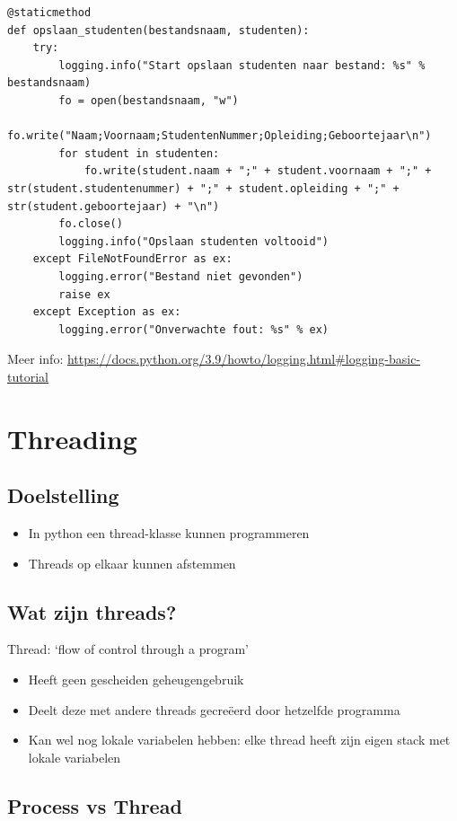 \documentclass{article}
\begin{document}
\begin{verbatim}
@staticmethod
def opslaan_studenten(bestandsnaam, studenten):
    try:
        logging.info("Start opslaan studenten naar bestand: %s" % bestandsnaam)
        fo = open(bestandsnaam, "w")
        fo.write("Naam;Voornaam;StudentenNummer;Opleiding;Geboortejaar\n")
        for student in studenten:
            fo.write(student.naam + ";" + student.voornaam + ";" + str(student.studentenummer) + ";" + student.opleiding + ";" + str(student.geboortejaar) + "\n")
        fo.close()
        logging.info("Opslaan studenten voltooid")
    except FileNotFoundError as ex:
        logging.error("Bestand niet gevonden")
        raise ex
    except Exception as ex:
        logging.error("Onverwachte fout: %s" % ex)
\end{verbatim}


Meer info: \url{https://docs.python.org/3.9/howto/logging.html#logging-basic-tutorial}

\section{Threading}

\subsection{Doelstelling}

\begin{itemize}
    \item In python een thread-klasse kunnen programmeren
    \item Threads op elkaar kunnen afstemmen
\end{itemize}

\subsection{Wat zijn threads?}

Thread: `flow of control through a program'
\begin{itemize}
    \item Heeft geen gescheiden geheugengebruik
    \item Deelt deze met andere threads gecreëerd door hetzelfde programma
    \item Kan wel nog lokale variabelen hebben: elke thread heeft zijn eigen stack met lokale variabelen
\end{itemize}

\subsection{Process vs Thread}
\end{document}
